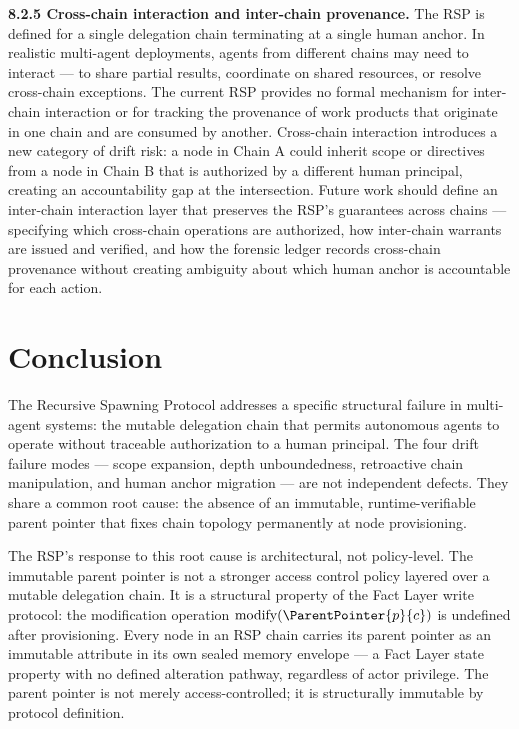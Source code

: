 \medskip
\noindent\textbf{8.2.5  Cross-chain interaction and inter-chain provenance.}
The RSP is defined for a single delegation chain terminating at a single human anchor. In realistic multi-agent deployments, agents from different chains may need to interact — to share partial results, coordinate on shared resources, or resolve cross-chain exceptions. The current RSP provides no formal mechanism for inter-chain interaction or for tracking the provenance of work products that originate in one chain and are consumed by another. Cross-chain interaction introduces a new category of drift risk: a node in Chain A could inherit scope or directives from a node in Chain B that is authorized by a different human principal, creating an accountability gap at the intersection. Future work should define an inter-chain interaction layer that preserves the RSP's guarantees across chains — specifying which cross-chain operations are authorized, how inter-chain warrants are issued and verified, and how the forensic ledger records cross-chain provenance without creating ambiguity about which human anchor is accountable for each action.

\section{Conclusion}
\label{sec:rs-conclusion}

The Recursive Spawning Protocol addresses a specific structural failure in multi-agent systems: the mutable delegation chain that permits autonomous agents to operate without traceable authorization to a human principal. The four drift failure modes — scope expansion, depth unboundedness, retroactive chain manipulation, and human anchor migration — are not independent defects. They share a common root cause: the absence of an immutable, runtime-verifiable parent pointer that fixes chain topology permanently at node provisioning.

The RSP's response to this root cause is architectural, not policy-level. The immutable parent pointer is not a stronger access control policy layered over a mutable delegation chain. It is a structural property of the Fact Layer write protocol: the modification operation $\text{modify}(\ParentPointer{p}{c})$ is undefined after provisioning. Every node in an RSP chain carries its parent pointer as an immutable attribute in its own sealed memory envelope — a Fact Layer state property with no defined alteration pathway, regardless of actor privilege. The parent pointer is not merely access-controlled; it is structurally immutable by protocol definition.

